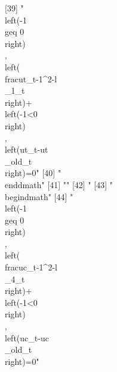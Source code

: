 [39] "\\left(-1\\geq 0\\right)\\, \\left(\\frac{{ut_{t}}}{-1^{2}}-{{l\\_1}_{t}}\\right)+\\left(-1<0\\right)\\, \\left({ut_{t}}-{{ut\\_old}_{t}}\\right)=0"                                                                                                                                                                                         
[40] "\\end{dmath}"                                                                                                                                                                                                                                                                                                                                
[41] ""                                                                                                                                                                                                                                                                                                                                            
[42] "%
[43] "\\begin{dmath}"                                                                                                                                                                                                                                                                                                                              
[44] "\\left(-1\\geq 0\\right)\\, \\left(\\frac{{uc_{t}}}{-1^{2}}-{{l\\_4}_{t}}\\right)+\\left(-1<0\\right)\\, \\left({uc_{t}}-{{uc\\_old}_{t}}\\right)=0"                                                                                                                                                                                         
